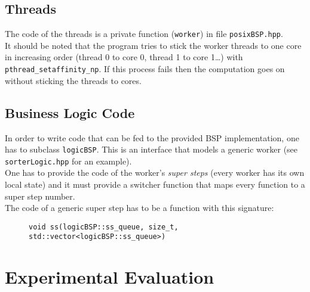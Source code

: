 \documentclass[]{article}
\def\code#1{\texttt{#1}}
\begin{document}
\subsection{Threads}
The code of the threads is a private function (\code{worker}) in file \code{posixBSP.hpp}. \\
It should be noted that the program tries to stick the worker threads to one core in increasing order (thread 0 to core 0, thread 1 to core 1\dots) with \code{pthread\_setaffinity\_np}. If this process fails then the computation goes on without sticking the threads to cores.


\subsection{Business Logic Code}
\label{sec:business}
In order to write code that can be fed to the provided BSP implementation, one has to subclass \code{logicBSP}. This is an interface that models a generic worker (see \code{sorterLogic.hpp} for an example). \\

One has to provide the code of the worker's \emph{super steps} (every worker has its own local state) and it must provide a switcher function that maps every function to a super step number. \\
The code of a generic super step has to be a function with this signature: 
\begin{figure}[H]
	\centering
	\begin{minipage}{0.9\textwidth}		
		\code{void ss(logicBSP::ss\_queue, size\_t, std::vector<logicBSP::ss\_queue>)}
	\end{minipage}
\end{figure}

\section{Experimental Evaluation}
\label{sec:eval}
\end{document}

